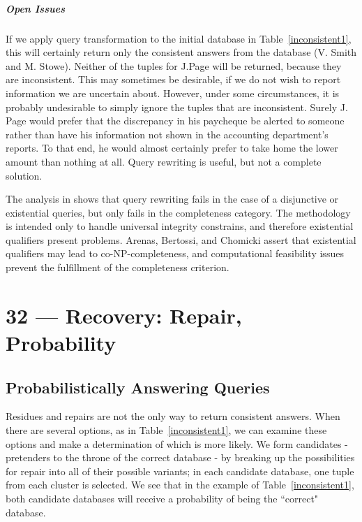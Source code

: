 \documentclass[a4paper]{report}
\begin{document}
\paragraph{Open Issues}
If we apply query transformation to the initial database in Table~\ref{inconsistent1}, this will certainly return only the consistent answers from the database (V. Smith and M. Stowe). Neither of the tuples for J.Page will be returned, because they are inconsistent. This may sometimes be desirable, if we do not wish to report information we are uncertain about. However, under some circumstances, it is probably undesirable to simply ignore the tuples that are inconsistent. Surely J. Page would prefer that the discrepancy in his paycheque be alerted to someone rather than have his information not shown in the accounting department's reports. To that end, he would almost certainly prefer to take home the lower amount than nothing at all. Query rewriting is useful, but not a complete solution.

The analysis in \cite{CQI} shows that query rewriting fails in the case of a disjunctive or existential queries, but only fails in the completeness category. The methodology is intended only to handle universal integrity constrains, and therefore existential qualifiers present problems. Arenas, Bertossi, and Chomicki assert that existential qualifiers may lead to co-NP-completeness, and computational feasibility issues prevent the fulfillment of the completeness criterion. 










\chapter*{32 --- Recovery: Repair, Probability}


\section*{Probabilistically Answering Queries}


Residues and repairs are not the only way to return consistent answers. When there are several options, as in Table~\ref{inconsistent1}, we can examine these options and make a determination of which is more likely. We form candidates - pretenders to the throne of the correct database -  by breaking up the possibilities for repair into all of their possible variants; in each candidate database, one tuple from each cluster is selected. We see that in the example of Table~\ref{inconsistent1}, both candidate databases will receive a probability of being the ``correct" database.
\end{document}

